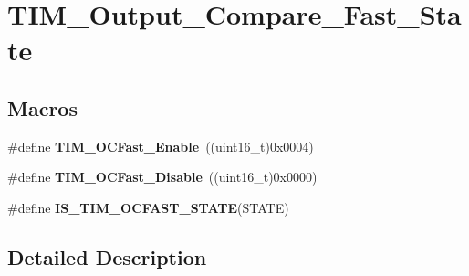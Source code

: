 \hypertarget{group___t_i_m___output___compare___fast___state}{\section{T\-I\-M\-\_\-\-Output\-\_\-\-Compare\-\_\-\-Fast\-\_\-\-State}
\label{group___t_i_m___output___compare___fast___state}
}
\subsection*{Macros}
\begin{DoxyCompactItemize}
\item 
\hypertarget{group___t_i_m___output___compare___fast___state_ga0cfb598c985363ee7004e52c97c524a3}{\#define {\bfseries T\-I\-M\-\_\-\-O\-C\-Fast\-\_\-\-Enable}~((uint16\-\_\-t)0x0004)}\label{group___t_i_m___output___compare___fast___state_ga0cfb598c985363ee7004e52c97c524a3}

\item 
\hypertarget{group___t_i_m___output___compare___fast___state_gab3d39f8797953cb58754205169d8278e}{\#define {\bfseries T\-I\-M\-\_\-\-O\-C\-Fast\-\_\-\-Disable}~((uint16\-\_\-t)0x0000)}\label{group___t_i_m___output___compare___fast___state_gab3d39f8797953cb58754205169d8278e}

\item 
\#define {\bfseries I\-S\-\_\-\-T\-I\-M\-\_\-\-O\-C\-F\-A\-S\-T\-\_\-\-S\-T\-A\-T\-E}(S\-T\-A\-T\-E)
\end{DoxyCompactItemize}


\subsection{Detailed Description}


